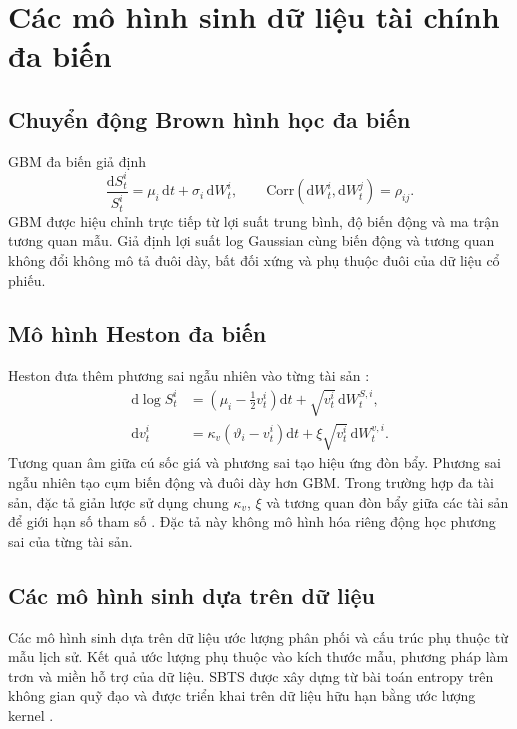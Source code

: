 \section{Các mô hình sinh dữ liệu tài chính đa biến}
\label{sec:c2-generators}

\subsection{Chuyển động Brown hình học đa biến}

GBM đa biến giả định
\begin{equation}
    \frac{\mathrm{d}S_t^i}{S_t^i}
    =\mu_i\,\mathrm{d}t+\sigma_i\,\mathrm{d}W_t^i,
    \qquad
    \mathrm{Corr}(\mathrm{d}W_t^i,\mathrm{d}W_t^j)=\rho_{ij}.
    \label{eq:c2-gbm}
\end{equation}
GBM được hiệu chỉnh trực tiếp từ lợi suất trung bình, độ biến động và ma trận
tương quan mẫu. Giả định lợi suất log Gaussian cùng biến động và tương quan
không đổi không mô tả đuôi dày, bất đối xứng và phụ thuộc đuôi của dữ liệu cổ
phiếu.

\subsection{Mô hình Heston đa biến}

Heston đưa thêm phương sai ngẫu nhiên vào từng tài sản
\parencite{Heston1993}:
\begin{align}
    \mathrm{d}\log S_t^i
    &=\left(\mu_i-\tfrac12 v_t^i\right)\mathrm{d}t
      +\sqrt{v_t^i}\,\mathrm{d}W_t^{S,i},\\
    \mathrm{d}v_t^i
    &=\kappa_v(\vartheta_i-v_t^i)\mathrm{d}t
      +\xi\sqrt{v_t^i}\,\mathrm{d}W_t^{v,i}.
    \label{eq:c2-heston}
\end{align}
Tương quan âm giữa cú sốc giá và phương sai tạo hiệu ứng đòn bẩy. Phương sai
ngẫu nhiên tạo cụm biến động và đuôi dày hơn GBM. Trong trường hợp đa tài sản,
đặc tả giản lược sử dụng chung $\kappa_v$, $\xi$ và tương quan đòn bẩy giữa các
tài sản để giới hạn số tham số \parencite{Dimitroff2011}. Đặc tả này không mô
hình hóa riêng động học phương sai của từng tài sản.

\subsection{Các mô hình sinh dựa trên dữ liệu}

Các mô hình sinh dựa trên dữ liệu ước lượng phân phối và cấu trúc phụ thuộc từ
mẫu lịch sử. Kết quả ước lượng phụ thuộc vào kích thước mẫu, phương pháp làm
trơn và miền hỗ trợ của dữ liệu. SBTS được xây dựng từ bài toán entropy trên
không gian quỹ đạo và được triển khai trên dữ liệu hữu hạn bằng ước lượng
kernel \parencite{Hamdouche2023}.

